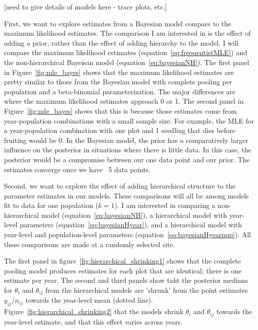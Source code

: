 \documentclass[12pt, oneside, titlepage]{article}   	%
\begin{document}
[need to give details of models here - trace plots, etc.]

First, we want to explore estimates from a Bayesian model compare to the maximum likelihood estimates. The comparison I am interested in is the effect of adding a prior, rather than the effect of adding hierarchy to the model. I will compare the maximum likelihood estimates (equation~\eqref{eq:frequentistMLE}) and the non-hierarchical Bayeisan model (equation~\eqref{eq:bayesianNH}). The first panel in Figure~\ref{fig:mle_bayes} shows that the maximum likelihood estimates are pretty similar to those from the Bayesian model with complete pooling per population and a beta-binomial parameterization. The major differences are where the maximum likelihood estimates approach 0 or 1. The second panel in Figure~\ref{fig:mle_bayes} shows that this is because those estimates come from year-population combinations with a small sample size. For example, the MLE for a year-population combination with one plot and 1 seedling that dies before fruiting would be 0. In the Bayesian model, the prior has a comparatively larger influence on the posterior in situations where there is little data. In this case, the posterior would be a compromise between our one data point and our prior. The estimates converge once we have ~5 data points.

Second, we want to explore the effect of adding hierarchical structure to the parameter estimates in our models. These comparisons will all be among models fit to data for one population ($k=1$). I am interested in comparing a non-hierarchical model (equation~\eqref{eq:bayesianNH}), a hierarchical model with year-level parameters (equation~\eqref{eq:bayesianHyear}), and a hierarchical model with year-level and population-level parameters (equation~\eqref{eq:bayesianHyearpop}). All these comparisons are made at a randomly selected site. 

The first panel in figure~\ref{fig:hierarchical_shrinking1} shows that the complete pooling model produces estimates for each plot that are identical; there is one estimate per year. The second and third panels show taht the posterior medians for $\theta_i$ and $\theta_{ij}$ from the hierarchical models are 'shrunk' from the point estimates $y_{ij}/n_{ij}$ towards the year-level mean (dotted line). Figure~\ref{fig:hierarchical_shrinking2} that the models shrink $\theta_i$ and $\theta_{ij}$ towards the year-level estimate, and that this effect varies across years. 
\end{document}
